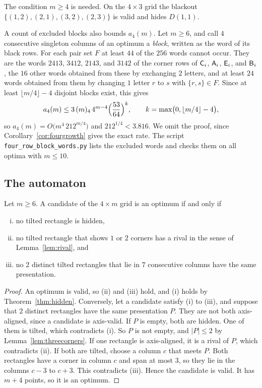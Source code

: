 The condition $m\ge4$ is needed. On the $4\times3$ grid the blackout
$\{(1,2),(2,1),(3,2),(2,3)\}$ is valid and hides $D(1,1)$.

\begin{remark}\label{thm:foursurvival}
A count of excluded blocks also bounds $a_4(m)$. Let $m\ge6$, and call $4$
consecutive singleton columns of an optimum a \emph{block}, written as the word of
its black rows. For each pair set $F$ at least $44$ of the $256$ words cannot
occur. They are the words $2413$, $3412$, $2143$, and $3142$ of the corner rows of
$\mathsf{C}_i$, $\mathsf{A}_i$, $\mathsf{E}_i$, and $\mathsf{B}_i$, the $16$ other words obtained from these by
exchanging $2$ letters, and at least $24$ words obtained from them by changing $1$
letter $r$ to $s$ with $\{r,s\}\in F$. Since at least $\lfloor m/4\rfloor-4$ disjoint
blocks exist, this gives
\[
a_4(m)\le3\,(m)_4\,4^{m-4}\Bigl(\frac{53}{64}\Bigr)^{k},\qquad
k=\max\bigl(0,\lfloor m/4\rfloor-4\bigr),
\]
so $a_4(m)=O\bigl(m^4\,212^{m/4}\bigr)$ and $212^{1/4}<3.816$. We omit the proof,
since Corollary~\ref{cor:fourgrowth} gives the exact rate. The script
\nolinkurl{four_row_block_words.py} lists the excluded words and checks them on
all optima with $m\le10$.
\end{remark}

\subsection{The automaton}

\begin{lemma}\label{lem:fourmemory}
Let $m\ge6$. A candidate of the $4\times m$ grid is an optimum if and only if
\begin{enumerate}[(i)]
\item no tilted rectangle is hidden,
\item no tilted rectangle that shows $1$ or $2$ corners has a rival in the sense
of Lemma~\ref{lem:rival}, and
\item no $2$ distinct tilted rectangles that lie in $7$ consecutive columns have
the same presentation.
\end{enumerate}
\end{lemma}

\begin{proof}
An optimum is valid, so (ii) and (iii) hold, and (i) holds by
Theorem~\ref{thm:hidden}. Conversely, let a candidate satisfy (i) to (iii), and
suppose that $2$ distinct rectangles have the same presentation $P$. They are not
both axis-aligned, since a candidate is axis-valid. If $P$ is empty, both
are hidden. One of them is tilted, which contradicts (i). So $P$ is not empty,
and $|P|\le2$ by Lemma~\ref{lem:threecorners}. If one rectangle is
axis-aligned, it is a rival of $P$, which contradicts (ii). If both are tilted,
choose a column $c$ that meets $P$. Both rectangles have a corner in column $c$
and span at most $3$, so they lie in the columns $c-3$ to $c+3$. This
contradicts (iii). Hence the candidate is valid. It has $m+4$ points, so it is
an optimum.
\end{proof}

